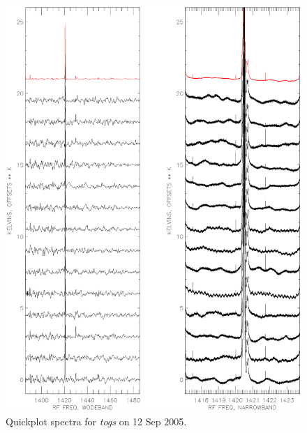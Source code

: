 \documentclass[psfig,preprint]{aastex}
\begin{document}
\begin{figure}[!p]
\begin{center}
\includegraphics[width=6in]{quickplot_0912.togs.ps}   
\end{center}
\caption{Quickplot spectra for {\it togs} on 12 Sep 2005.\label{0912}}
\end{figure}
\end{document}
